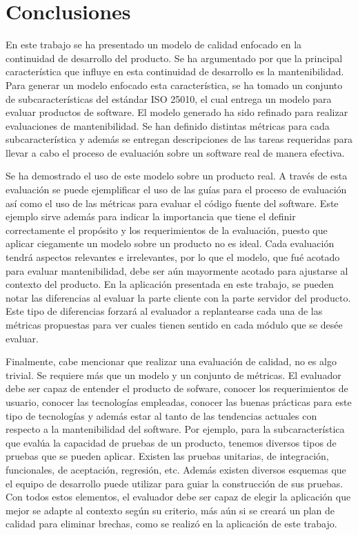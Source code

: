 \chapter{Conclusiones}
\label{chap:conclusiones}

En este trabajo se ha presentado un modelo de calidad enfocado en la continuidad
de desarrollo del producto. Se ha argumentado por que la principal característica
que influye en esta continuidad de desarrollo es la mantenibilidad.
Para generar un modelo enfocado esta característica, se ha tomado un conjunto
de subcaracterísticas del estándar ISO 25010, el cual entrega un modelo para
evaluar productos de software. El modelo generado ha sido
refinado para realizar evaluaciones de mantenibilidad. Se han
definido distintas métricas para cada subcaracterística y además se entregan
descripciones de las tareas requeridas para llevar a cabo el proceso de evaluación
sobre un software real de manera efectiva.

Se ha demostrado el uso de este modelo sobre un producto real. A través de esta
evaluación se puede ejemplificar el uso de las guías para el proceso de evaluación
así como el uso de las métricas para evaluar el código fuente del software.
Este ejemplo sirve además para indicar la importancia que tiene el definir correctamente
el propósito y los requerimientos de la evaluación, puesto que aplicar
ciegamente un modelo sobre un producto no es ideal. Cada evaluación tendrá
aspectos relevantes e irrelevantes, por lo que el modelo, que fué acotado
para evaluar mantenibilidad, debe ser aún mayormente acotado para ajustarse
al contexto del producto. En la aplicación presentada en este trabajo, se pueden
notar las diferencias al evaluar la parte cliente con la parte servidor del producto.
Este tipo de diferencias forzará al evaluador a replantearse cada una de las métricas
propuestas para ver cuales tienen sentido en cada módulo que se desée evaluar.

Finalmente, cabe mencionar que realizar una evaluación de calidad, no es algo trivial.
Se requiere más que un modelo y un conjunto de métricas. El evaluador debe ser
capaz de entender el producto de sofware, conocer los requerimientos de usuario,
conocer las tecnologías empleadas, conocer las buenas prácticas para este tipo
de tecnologías y además estar al tanto de las tendencias actuales con respecto
a la mantenibilidad del software. Por ejemplo, para la subcaracterística
que evalúa la capacidad de pruebas de un producto, tenemos diversos tipos
de pruebas que se pueden aplicar. Existen las pruebas unitarias, de integración,
funcionales, de aceptación, regresión, etc. Además existen diversos esquemas
que el equipo de desarrollo puede utilizar para guiar la construcción de sus pruebas.
Con todos estos elementos, el evaluador debe ser capaz de elegir la aplicación
que mejor se adapte al contexto según su criterio, más aún si se creará un plan
de calidad para eliminar brechas, como se realizó en la aplicación de este trabajo.

